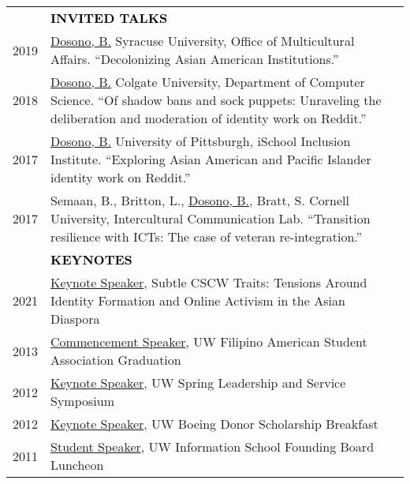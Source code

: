 \documentclass[11pt]{article}
\begin{document}
{{\begin{longtable}{Rp{0.75in}p{5.0in}}
& \textcolor{black}{\uppercase{\textbf{Invited Talks}}}\\

\footnotesize{2019} & \href{https://news.syr.edu/blog/2019/03/22/celebrate-asian-american-and-pacific-islander-heritage-month-this-april/}{{Dosono, B.}} Syracuse University, Office of Multicultural Affairs. ``Decolonizing Asian American Institutions.''\\

\footnotesize{2018} & \href{https://cs.colgate.edu/cs/events/151/}{{Dosono, B.}} Colgate University, Department of Computer Science. ``Of shadow bans and sock puppets: Unraveling the deliberation and moderation of identity work on Reddit.''\\

\footnotesize{2017} & \href{http://www.sis.pitt.edu/i3/i3-cohorts/2017/schedule.html}{{Dosono, B.}} University of Pittsburgh, iSchool Inclusion Institute. ``Exploring Asian American and Pacific Islander identity work on Reddit.''\\

\footnotesize{2017} & Semaan, B., Britton, L., \href{http://bit.ly/CornellTalk}{{Dosono, B.}}, Bratt, S. Cornell University, Intercultural Communication Lab. ``Transition resilience with ICTs: The case of veteran re-integration.''\\

& \textcolor{black}{\uppercase{\textbf{Keynotes}}}\\

\footnotesize{2021} & \href{https://bit.ly/subtlecscwtraits}{{Keynote Speaker}}, Subtle CSCW Traits: Tensions Around Identity Formation and Online Activism in the Asian Diaspora\\

\footnotesize{2013} & \href{https://youtu.be/uz1tukrR-7E}{{Commencement Speaker}}, UW Filipino American Student Association Graduation\\

\footnotesize{2012} & \href{https://youtu.be/WMPhe6H7yiM}{{Keynote Speaker}}, UW Spring Leadership and Service Symposium\\

\footnotesize{2012} & \href{https://ischool.uw.edu/news/2016/12/bryan-dosono-informatics-student-speaks-boeing-scholarship-breakfast}{{Keynote Speaker}}, UW Boeing Donor Scholarship Breakfast\\

\footnotesize{2011} & \href{https://ischool.uw.edu/about/leadership/founding-board}{{Student Speaker}}, UW Information School Founding Board Luncheon\\


\end{longtable}}}
\end{document}
